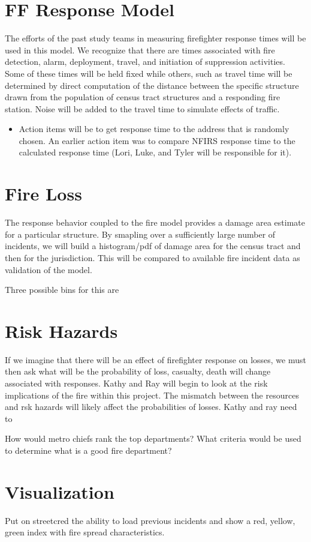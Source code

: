 \documentclass[12pt,oneside]{article}
\begin{document}
\section{FF Response Model}

The efforts of the past study teams in measuring firefighter response times will be used in this model.  We recognize that there are times associated with fire detection, alarm, deployment, travel, and initiation of suppression activities. Some of these times will be held fixed while others, such as travel time will be determined by direct computation of the distance between the specific structure drawn from the population of census tract structures and a responding fire station.  Noise will be added to the travel time to simulate effects of traffic. 

\begin{itemize}
\item Action items will be to get response time to the address that is randomly chosen.  An earlier action item was to compare NFIRS response time to the calculated response time (Lori, Luke, and Tyler will be responsible for it).
\end{itemize}

\section{Fire Loss}

The response behavior coupled to the fire model provides a damage area estimate for a particular structure.  By smapling over a sufficiently large number of incidents, we will build a histogram/pdf of damage area for the census tract and then for the jurisdiction.  This will be compared to available fire incident data as validation of the model.

Three possible bins for this are 

\section{Risk Hazards}
If we imagine that there will be an effect of firefighter response on losses, we must then ask what will be the probability of loss, casualty, death will change associated with responses.  Kathy and Ray will begin to look at the risk implications of the fire within this project.  The mismatch between the resources and rsk hazards will likely affect the probabilities of losses.  Kathy and ray need to 


How would metro chiefs rank the top departments?  What criteria would be used to determine what is a good fire department?  

\section{Visualization}

Put on streetcred the ability to load previous incidents and show a red, yellow, green index with fire spread characteristics.
\end{document}
